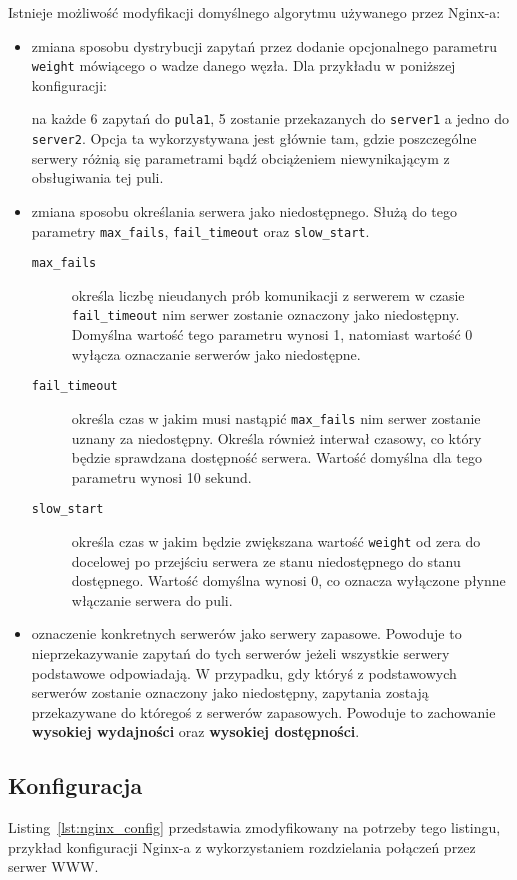 {Istnieje możliwość modyfikacji domyślnego algorytmu używanego przez Nginx-a:
\begin{itemize}
	\item zmiana sposobu dystrybucji zapytań przez dodanie opcjonalnego parametru \texttt{weight} mówiącego o wadze danego węzła. Dla przykładu w poniższej konfiguracji:
	
	na każde 6 zapytań do \texttt{pula1}, 5 zostanie przekazanych do \texttt{server1} a jedno do \texttt{server2}.
	Opcja ta wykorzystywana jest głównie tam, gdzie poszczególne serwery różnią się parametrami bądź obciążeniem niewynikającym z obsługiwania tej puli.
	\item zmiana sposobu określania serwera jako niedostępnego.
	Służą do tego parametry \texttt{max\_fails}, \texttt{fail\_timeout} oraz \texttt{slow\_start}.\\
	\begin{description}
	\item[\texttt{max\_fails}] określa liczbę nieudanych prób komunikacji z serwerem w czasie \texttt{fail\_timeout} nim serwer zostanie oznaczony jako niedostępny.
	Domyślna wartość tego parametru wynosi 1, natomiast wartość 0 wyłącza oznaczanie serwerów jako niedostępne.
	\item[\texttt{fail\_timeout}] określa czas w jakim musi nastąpić \texttt{max\_fails} nim serwer zostanie uznany za niedostępny.
	Określa również interwał czasowy, co który będzie sprawdzana dostępność serwera.
	Wartość domyślna dla tego parametru wynosi 10 sekund.
	\item[\texttt{slow\_start}] określa czas w jakim będzie zwiększana wartość \texttt{weight} od zera do docelowej po przejściu serwera ze stanu niedostępnego do stanu dostępnego.
	Wartość domyślna wynosi 0, co oznacza wyłączone płynne włączanie serwera do puli.
	\end{description}
	\item oznaczenie konkretnych serwerów jako serwery zapasowe.  
	Powoduje to nieprzekazywanie zapytań do tych serwerów jeżeli wszystkie serwery podstawowe odpowiadają.
	W przypadku, gdy któryś z podstawowych serwerów zostanie oznaczony jako niedostępny, zapytania zostają przekazywane do któregoś z serwerów zapasowych.
	Powoduje to zachowanie \textbf{wysokiej wydajności} oraz \textbf{wysokiej dostępności}.	
\end{itemize}
\subsection{Konfiguracja}
Listing~\ref{lst:nginx_config} przedstawia zmodyfikowany na potrzeby tego listingu, przykład konfiguracji Nginx-a z wykorzystaniem rozdzielania połączeń przez serwer WWW.

}
